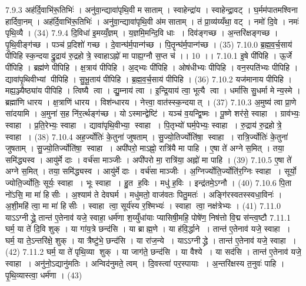 7.9.3
अह॑र्दि॒वाभि॑रू॒तिभिः॑ । अनु॑वा॒न्द्यावा॑पृथि॒वी म॑साताम् । स्वाहेन्द्रा॑य । स्वाहेन्द्रा॒वट् । घ॒र्मम॑पातमश्विना हार्दिवा॒नम् । अह॑र्दि॒वाभि॑रू॒तिभिः॑ । अनु॑वा॒न्द्यावा॑पृथि॒वी अ॑मसाताम् । तं प्रा॒व्य॑य्यँथा॒ वट् । नमो॑ दि॒वे । नमः॑ पृथि॒व्यै । (34)
7.9.4
दि॒विधा॑ इ॒मय्यँ॒ज्ञम् । य॒ज्ञमि॒मन्दि॒वि धाः । दिव॑ङ्गच्छ । अ॒न्तरि॑क्षङ्गच्छ । पृ॒थि॒वीङ्ग॑च्छ । पञ्च॑ प्र॒दिशो॑ गच्छ । दे॒वान्घ॑र्म॒पान्ग॑च्छ । पि॒तॄन्घ॑र्म॒पान्ग॑च्छ । (35)
7.10.0
ब्र॒ह्म॒व॒र्च॒साय॑ पीपिहि स्क॒न्दयाद्रु॒द्राय॑ रु॒द्रहोत्रे॒ स्वाहाऽह्नो॑ मा पाह्य॒ग्नौ स॒प्त च॑ ।। 10 ।।
7.10.1
इ॒षे पी॑पिहि । ऊ॒र्जे पी॑पिहि । ब्रह्म॑णे पीपिहि । क्ष॒त्राय॑ पीपिहि । अ॒द्भ्यः पी॑पिहि । ओष॑धीभ्यः पीपिहि । वन॒स्पति॑भ्यः पीपिहि । द्यावा॑पृ॒थिवीभ्यां पीपिहि । सु॒भू॒ताय॑ पीपिहि । ब्र॒ह्म॒व॒र्च॒साय॑ पीपिहि । (36)
7.10.2
यज॑मानाय पीपिहि । मह्य॒ञ्ज्यैष्ठ्या॑य पीपिहि । त्विष्यै त्वा । द्यु॒म्नाय॑ त्वा । इ॒न्द्रि॒याय॑ त्वा॒ भूत्यै त्वा । धर्मा॑सि सु॒धर्मा मेन्य॒स्मे । ब्रह्मा॑णि धारय । क्ष॒त्राणि॑ धारय । विश॑न्धारय । नेत्त्वा॒ वात॑स्स्क॒न्दयात् । (37)
7.10.3
अ॒मुष्य॑ त्वा प्रा॒णे सा॑दयामि । अ॒मुना॑ स॒ह नि॑र॒र्त्थङ्ग॑च्छ । योऽस्मान्द्वेष्टि॑ । यञ्च॑ व॒यन्द्वि॒ष्मः । पू॒ष्णे शर॑से॒ स्वाहा । ग्राव॑भ्यः॒ स्वाहा । प्र॒ति॒रेभ्यः॒ स्वाहा । द्यावा॑पृथि॒वीभ्या॒॒ स्वाहा । पि॒तृभ्यो॑ घर्म॒पेभ्यः॒ स्वाहा । रु॒द्राय॑ रु॒द्रहोत्रे॒ स्वाहा । (38)
7.10.4
अह॒र्ज्योतिः॑ के॒तुना॑ जुषताम् । सु॒ज्यो॒तिर्ज्योति॑षा॒॒ स्वाहा । रात्रि॒र्ज्योतिः॑ के॒तुना॑ जुषताम् । सु॒ज्यो॒तिर्ज्योति॑षा॒॒ स्वाहा । अपी॑परो॒ माऽह्नो॒ रात्रि॑यै मा पाहि । ए॒षा ते॑ अग्ने स॒मित् । तया॒ समि॑द्ध्यस्व । आयु॑र्मे दाः । वर्च॑सा माञ्जीः । अपी॑परो मा॒ रात्रि॑या॒ अह्नो॑ मा पाहि । (39)
7.10.5
ए॒षा ते॑ अग्ने स॒मित् । तया॒ समि॑द्ध्यस्व । आयु॑र्मे दाः । वर्च॑सा माञ्जीः । अ॒ग्निर्ज्योति॒र्ज्योति॑र॒ग्निः स्वाहा । सूर्यो॒ ज्योति॒र्ज्योतिः॒ सूर्यः॒ स्वाहा । भूः स्वाहा । हु॒त ह॒विः । मधु॑ ह॒विः । इन्द्र॑तमे॒ऽग्नौ । (40)
7.10.6
पि॒ता नो॑ऽसि॒ मा मा॑ हिसीः । अ॒श्याम॑ ते देवघर्म । मधु॑मतो॒ वाज॑वतः पितु॒मतः॑ । अङ्गि॑रस्वतस्स्वधा॒विनः॑ । अ॒शी॒महि॑ त्वा॒ मा मा॑ हिसीः । स्वाहा त्वा॒ सूर्य॑स्य र॒श्मिभ्यः॑ । स्वाहा त्वा॒ नक्ष॑त्रेभ्यः । (41)
7.11.0
याऽऽग्नीद्ध्रे॒ तान्त॑ ए॒तेनाव॑ यजे॒ स्वाहा॒ धर्म॑णा श॒य्युँधा॑याः प्यासिषी॒महि॒ पोषे॑ण॒ निष॑त्तो वि॒द्म स॑न्त्व॒ष्टौ
7.11.1
घर्म॒ या ते॑ दि॒वि शुक् । या गा॑य॒त्रे छन्द॑सि । या ब्राह्म॒णे । या ह॑वि॒र्द्धाने । तान्त॑ ए॒तेनाव॑ यजे॒ स्वाहा । घर्म॒ या ते॒ऽन्तरि॑क्षे॒ शुक् । या त्रैष्टु॑भे॒ छन्द॑सि । या रा॑ज॒न्ये । याऽऽग्नीद्ध्रे । तान्त॑ ए॒तेनाव॑ यजे॒ स्वाहा । (42)
7.11.2
घर्म॒ या ते॑ पृथि॒व्या शुक् । या जाग॑ते॒ छन्द॑सि । या वैश्ये । या सद॑सि । तान्त॑ ए॒तेनाव॑ यजे॒ स्वाहा । अनु॑नो॒ऽद्यानु॑मतिः । अन्विद॑नुमते॒ त्वम् । दि॒वस्त्वा॑ पर॒स्पायाः । अ॒न्तरि॑क्षस्य त॒नुवः॑ पाहि । पृ॒थि॒व्यास्त्वा॒ धर्म॑णा । (43)
